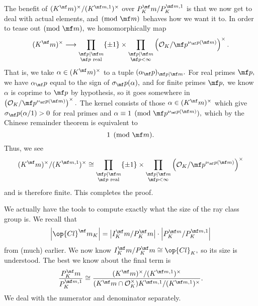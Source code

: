 The benefit of $(K^\mf m)^\times/(K^{\mf m,1})^\times$ over $P_K^\mf m/P_K^{\mf m,1}$ is that we now get to deal with actual elements, and$\pmod{\mf m}$ behaves how we want it to. In order to tease out$\pmod{\mf m},$ we homomorphically map
\[(K^\mf m)^\times\longrightarrow\prod_{\substack{\mf p\mid\mf m\\\mf p\text{ real}}}\{\pm1\}\times\prod_{\substack{\mf p\mid\mf m\\\mf p<\infty}}\left(\mathcal O_K/\mf p^{\nu_\mf p(\mf m)}\right)^\times.\]
That is, we take $\alpha\in(K^\mf m)^\times$ to a tuple $(\alpha_\mf p)_{\mf p\mid\mf m}.$ For real primes $\mf p,$ we have $\alpha_\mf p$ equal to the sign of $\sigma_\mf p(\alpha),$ and for finite primes $\mf p,$ we know $\alpha$ is coprime to $\mf p$ by hypothesis, so it goes somewhere in $\left(\mathcal O_K/\mf p^{\nu_\mf p(\mf m)}\right)^\times.$ The kernel consists of those $\alpha\in(K^\mf m)^\times$ which give $\sigma_\mf p(\alpha/1)>0$ for real primes and $\alpha\equiv1\pmod{\mf p^{\nu_\mf p(\mf m)}},$ which by the Chinese remainder theorem is equivalent to
\[1\pmod{\mf m}.\]
Thus, we see
\[(K^\mf m)^\times/(K^{\mf m,1})^\times\cong\prod_{\substack{\mf p\mid\mf m\\\mf p\text{ real}}}\{\pm1\}\times\prod_{\substack{\mf p\mid\mf m\\\mf p<\infty}}\left(\mathcal O_K/\mf p^{\nu_\mf p(\mf m)}\right)^\times\]
and is therefore finite. This completes the proof.

We actually have the tools to compute exactly what the size of the ray class group is. We recall that
\[\left|\op{Cl}^\mf m_K\right|=\left|I_K^\mf m/P_K^\mf m\right|\cdot\left|P_K^{\mf m}/P_K^{\mf m,1}\right|\]
from (much) earlier. We now know $I_K^\mf m/P_K^\mf m\cong\op{Cl}_K,$ so its size is understood. The best we know about the final term is
\[\frac{P_K^\mf m}{P_K^{\mf m,1}}\cong\frac{(K^\mf m)^\times/(K^{\mf m,1})^\times}{(K^\mf m\cap\mathcal O_K^\times)K^{\mf m,1}/(K^{\mf m,1})^\times}.\]
We deal with the numerator and denominator separately.

